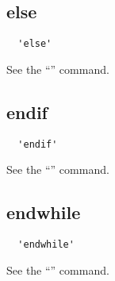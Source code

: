 \documentclass{article}
\begin{document}
\subsection{\label{else}else}
\begin{verbatim}
  'else'
\end{verbatim}
See the ``'' command.

\subsection{\label{endif}endif}
\begin{verbatim}
  'endif'
\end{verbatim}
See the ``'' command.

\subsection{\label{endwhile}endwhile}
\begin{verbatim}
  'endwhile'
\end{verbatim}
See the ``'' command.
\end{document}
